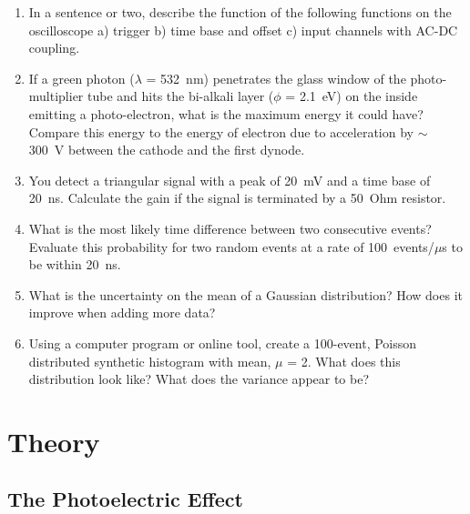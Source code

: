 \documentclass[10pt,aps,twocolumn,secnumarabic,balancelastpage,amsmath,amssymb,nofootinbib,floatfix]{revtex4}
\begin{document}
\begin{enumerate}
\item In a sentence or two, describe the function of the following functions on the oscilloscope a) trigger b) time base and offset c) input channels with AC-DC coupling.
\item If a green photon ($\lambda$ = 532~nm) penetrates the glass window of the photo-multiplier tube and hits the bi-alkali layer ($\phi$ = 2.1~eV) on the inside emitting a photo-electron, what is the maximum energy it could have? Compare this energy to the energy of electron due to acceleration by $\sim$ 300~V between the cathode and the first dynode.
\item You detect a triangular signal with a peak of 20~mV and a time base of 20~ns. Calculate the gain if the signal is terminated by a 50~Ohm resistor. 
\item What is the most likely time difference between two consecutive events? Evaluate this probability for two random events at a rate of 100~events/$\mu$s to be within 20~ns.
\item What is the uncertainty on the mean of a Gaussian distribution? How does it improve when adding more data?
\item Using a computer program or online tool, create a 100-event, Poisson distributed synthetic histogram with mean, $\mu$ = 2. What does this distribution look like? What does the variance appear to be?


\end{enumerate}

\section{Theory}

\subsection{The Photoelectric Effect}
\end{document}
